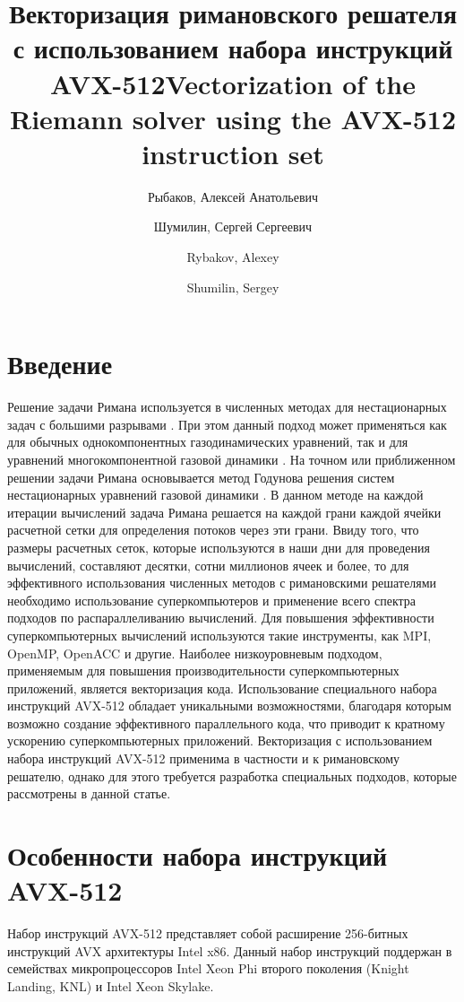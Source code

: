\documentclass[utf8]{psta}
\title[векторизация римановского решателя]{Векторизация римановского решателя с использованием набора инструкций AVX-512}
\author{Рыбаков, Алексей Анатольевич}
\author{Шумилин, Сергей Сергеевич}
\title[vectorization of the Riemann solver]{Vectorization of the Riemann solver using the AVX-512 instruction set}
\author{Rybakov, Alexey}
\author{Shumilin, Sergey}
\begin{document}
           
\maketitle   

\section*{Введение}

Решение задачи Римана используется в численных методах для нестационарных задач с большими разрывами \cite{KulPogSemRiemann}.
При этом данный подход может применяться как для обычных однокомпонентных газодинамических уравнений, так и для уравнений многокомпонентной газовой динамики \cite{BorRykRiemann}.
На точном или приближенном решении задачи Римана основывается метод Годунова решения систем нестационарных уравнений газовой динамики \cite{Godunov}.
В данном методе на каждой итерации вычислений задача Римана решается на каждой грани каждой ячейки расчетной сетки для определения потоков через эти грани.
Ввиду того, что размеры расчетных сеток, которые используются в наши дни для проведения вычислений, составляют десятки, сотни миллионов ячеек и более, то для эффективного использования численных методов с римановскими решателями необходимо использование суперкомпьютеров и применение всего спектра подходов по распараллеливанию вычислений.
Для повышения эффективности суперкомпьютерных вычислений используются такие инструменты, как MPI, OpenMP, OpenACC и другие.
Наиболее низкоуровневым подходом, применяемым для повышения производительности суперкомпьютерных приложений, является векторизация кода.
Использование специального набора инструкций AVX-512 обладает уникальными возможностями, благодаря которым возможно создание эффективного параллельного кода, что приводит к кратному ускорению суперкомпьютерных приложений.
Векторизация с использованием набора инструкций AVX-512 применима в частности и к римановскому решателю, однако для этого требуется разработка специальных подходов, которые рассмотрены в данной статье. 

\section{Особенности набора инструкций AVX-512}

Набор инструкций AVX-512 представляет собой расширение 256-битных инструкций AVX архитектуры Intel x86.
Данный набор инструкций поддержан в семействах микропроцессоров Intel Xeon Phi второго поколения (Knight Landing, KNL) и Intel Xeon Skylake.
\end{document}

